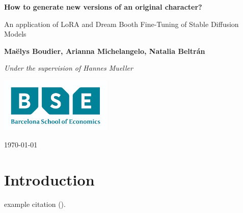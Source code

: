 \documentclass[12pt, a4paper]{article}
\begin{document}
\begin{titlepage}
    \begin{center}
        \vspace*{3cm}
            
        \Huge
        \textbf{How to generate new versions of an original character?}
            
        \vspace{1cm}
        \Large
        An application of LoRA and Dream Booth Fine-Tuning of Stable Diffusion Models
            
        \vspace{1.5cm}
        \large
            
        \textbf{Maëlys Boudier, Arianna Michelangelo, Natalia Beltrán}    %
        
            
        \vfill
        
        \textit{Under the supervision of Hannes Mueller}
            
        \vspace{1cm}
            
        \includegraphics[width=0.4\textwidth]{bse_logo.png}
        \\
        
        \Large
        
        \today
            
    \end{center}
\end{titlepage}


\section{Introduction}
example citation (\cite{lora2021}).



\printbibliography[]
\end{document}
